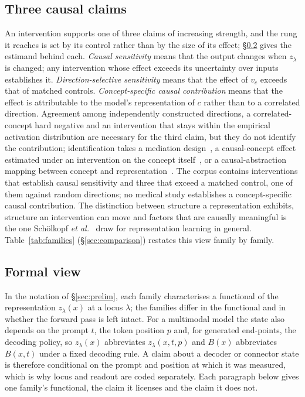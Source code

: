 \subsection{Three causal claims}
\label{sec:causal-claims}

An intervention supports one of three claims of increasing strength, and the rung it reaches is set by
its control rather than by the size of its effect; \S\ref{sec:formal} gives the estimand behind each.
\emph{Causal sensitivity} means that the output changes when $z_\lambda$ is changed; any intervention
whose effect exceeds its uncertainty over inputs establishes it. \emph{Direction-selective sensitivity}
means that the effect of $v_c$ exceeds that of matched controls. \emph{Concept-specific causal
contribution} means that the effect is attributable to the model's representation of $c$ rather than to
a correlated direction. Agreement among independently constructed directions, a correlated-concept hard
negative and an intervention that stays within the empirical activation distribution are necessary for
the third claim, but they do not identify the contribution; identification takes a mediation
design~\cite{pearl2001direct,imai2010mediation}, a causal-concept effect estimated under an
intervention on the concept itself~\cite{goyal2019cace}, or a causal-abstraction mapping between concept
and representation~\cite{geiger2021causal,geiger2023causal}. The corpus contains interventions that
establish causal sensitivity and three that exceed a matched control, one of them against random
directions; no medical study establishes a concept-specific causal contribution. The distinction between structure a representation exhibits, structure an intervention
can move and factors that are causally meaningful is the one Sch\"olkopf \emph{et
al.}~\cite{scholkopf2021causal} draw for representation learning in general. Table~\ref{tab:families}
(\S\ref{sec:comparison}) restates this view family by family.

\subsection{Formal view}
\label{sec:formal}

In the notation of \S\ref{sec:prelim}, each family characterises a functional of
the representation $z_\lambda(x)$ at a locus $\lambda$; the families differ in the functional and in
whether the forward pass is left intact. For a multimodal model the state also depends on the prompt
$t$, the token position $p$ and, for generated end-points, the decoding policy, so $z_\lambda(x)$
abbreviates $z_\lambda(x,t,p)$ and $B(x)$ abbreviates $B(x,t)$ under a fixed decoding rule. A claim
about a decoder or connector state is therefore conditional on the prompt and position at which it was
measured, which is why locus and readout are coded separately. Each paragraph below gives one family's
functional, the claim it licenses and the claim it does not.

